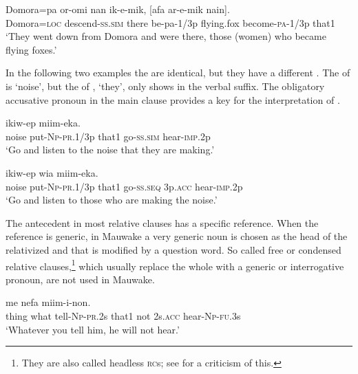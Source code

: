 \ea%
\label{ex:8:x1556}
\gll Domora=pa  or-omi  nan  ik-e-mik,  [afa ar-e-mik  nain]. \\
Domora=\textsc{loc} descend-\textsc{ss}.\textsc{sim} there be-pa-1/3p  flying.fox become-\textsc{pa}-1/3p  that1\\
\glt`They went down from Domora and were there, those (women) who became flying foxes.'
\z


In the following two examples the  are identical, but they have a different . The  of  is  `noise', but the  of ,  `they', only shows in the verbal suffix. The obligatory accusative pronoun in the main clause provides a key for the interpretation of .

\ea%
\label{ex:8:x1557}
  ikiw-ep  miim-eka. \\
noise  put-\textsc{Np}-\textsc{pr}.1/3p that1 go-\textsc{ss}.\textsc{sim} hear-\textsc{imp}.2p\\
\glt`Go and listen to the noise that they are making.'
\z


\ea%
\label{ex:8:x1558}
  ikiw-ep  wia  miim-eka.\\
noise  put-\textsc{Np}-\textsc{pr}.1/3p that1 go-\textsc{ss}.\textsc{seq} 3p.\textsc{acc} hear-\textsc{imp}.2p\\
\glt`Go and listen to those who are making the noise.'
\z


The antecedent in most relative clauses has a specific reference. When the reference is generic, in Mauwake a very generic noun is chosen as the head of the relativized  and that is modified by a question word. So called free \citep[213]{Andrews2007b} or condensed \citep[359]{Dixon2010b} relative clauses,\footnote{They are also called headless \textsc{rc}s; see \citet[317,360]{Dixon2010b} for a criticism of this.} which usually replace the whole  with a generic or interrogative pronoun, are not used in Mauwake. 

\ea%
\label{ex:8:x1562}
  me  nefa  miim-i-non.\\
thing  what  tell-\textsc{Np}-\textsc{pr}.2s that1 not 2s.\textsc{acc} hear-\textsc{Np}-\textsc{fu}.3s\\
\glt`Whatever you tell him, he will not hear.'
\z


